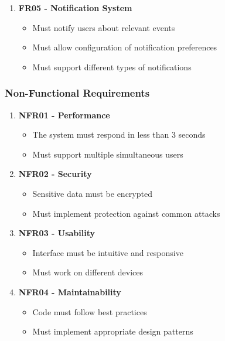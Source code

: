 \documentclass[12pt,a4paper]{article}
\begin{document}
\begin{enumerate}
    \item \textbf{FR05 - Notification System}
    \begin{itemize}
        \item Must notify users about relevant events
        \item Must allow configuration of notification preferences
        \item Must support different types of notifications
    \end{itemize}
\end{enumerate}

\subsubsection{Non-Functional Requirements}
\begin{enumerate}
    \item \textbf{NFR01 - Performance}
    \begin{itemize}
        \item The system must respond in less than 3 seconds
        \item Must support multiple simultaneous users
    \end{itemize}
    
    \item \textbf{NFR02 - Security}
    \begin{itemize}
        \item Sensitive data must be encrypted
        \item Must implement protection against common attacks
    \end{itemize}
    
    \item \textbf{NFR03 - Usability}
    \begin{itemize}
        \item Interface must be intuitive and responsive
        \item Must work on different devices
    \end{itemize}
    
    \item \textbf{NFR04 - Maintainability}
    \begin{itemize}
        \item Code must follow best practices
        \item Must implement appropriate design patterns
    \end{itemize}
\end{enumerate}
\end{document}
